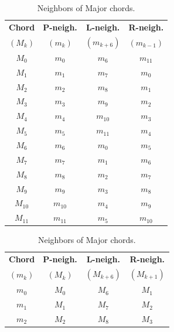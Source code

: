 \documentclass[12pt,letterpaper]{amsart}
\begin{document}
\begin{table}[H]
    \centering
    \scriptsize
    \renewcommand{\arraystretch}{1.2}
    
    \begin{minipage}[t]{0.48\textwidth}
        \centering
        \begin{tabular}{|c||c|c|c|}
            \hline
            \textbf{Chord} & \textbf{P-neigh.} & \textbf{L-neigh.} & \textbf{R-neigh.} \\[-0.5ex]
            $(M_k)$ & $(m_k)$ & $(m_{k+6})$ & $(m_{k-1})$ \\
            \hline
            $M_0$ & $m_0$ & $m_6$ & $m_{11}$ \\
            $M_1$ & $m_1$ & $m_7$ & $m_0$ \\
            $M_2$ & $m_2$ & $m_8$ & $m_1$ \\
            $M_3$ & $m_3$ & $m_9$ & $m_2$ \\
            $M_4$ & $m_4$ & $m_{10}$ & $m_3$ \\
            $M_5$ & $m_5$ & $m_{11}$ & $m_4$ \\
            $M_6$ & $m_6$ & $m_0$ & $m_5$ \\
            $M_7$ & $m_7$ & $m_1$ & $m_6$ \\
            $M_8$ & $m_8$ & $m_2$ & $m_7$ \\
            $M_9$ & $m_9$ & $m_3$ & $m_8$ \\
            $M_{10}$ & $m_{10}$ & $m_4$ & $m_9$ \\
            $M_{11}$ & $m_{11}$ & $m_5$ & $m_{10}$ \\
            \hline
        \end{tabular}
        \caption{Neighbors of Major chords.}
        \label{tab:neighbors_M_6_1}
    \end{minipage}
    \hfill
    \begin{minipage}[t]{0.48\textwidth}
        \centering
        \begin{tabular}{|c||c|c|c|}
            \hline
            \textbf{Chord} & \textbf{P-neigh.} & \textbf{L-neigh.} & \textbf{R-neigh.} \\[-0.5ex]
            $(m_k)$ & $(M_k)$ & $(M_{k+6})$ & $(M_{k+1})$ \\
            \hline
            $m_0$ & $M_0$ & $M_6$ & $M_1$ \\
            $m_1$ & $M_1$ & $M_7$ & $M_2$ \\
            $m_2$ & $M_2$ & $M_8$ & $M_3$ \\

\end{tabular}
\end{minipage}
\end{table}
\end{document}
